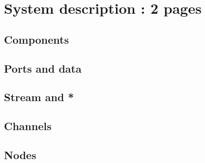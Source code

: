 \section{System description : 2 pages}
\subsection*{Components}
\subsection*{Ports and data}
\subsection*{Stream and *}
\subsection*{Channels}
\subsection*{Nodes}
